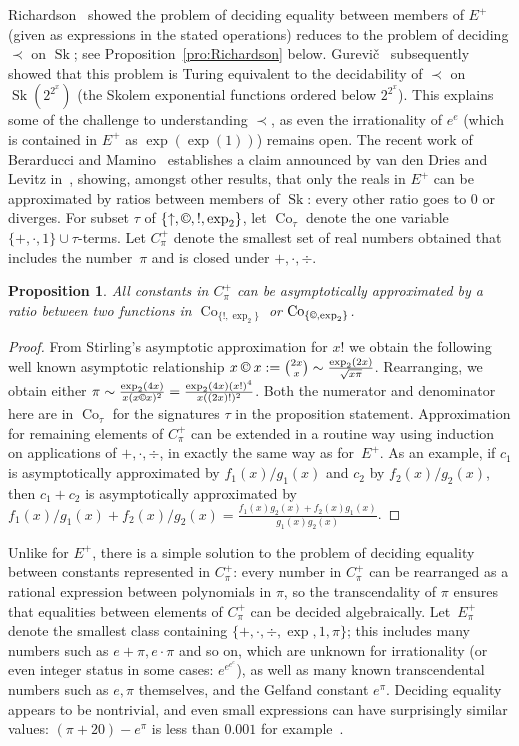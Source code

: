 \documentclass[eqnor,reqno]{amsart}
\theoremstyle{plain}
\newtheorem{pro}[thm]{Proposition}
\theoremstyle{definition}
\newcommand{\cc}{\mathbin{\textup{\copyright}}}
\newcommand{\Sk}{\operatorname{Sk}}
\newcommand{\Co}{\operatorname{Co}}
\begin{document}
Richardson~\cite{ric} showed the problem of deciding equality between members of $E^+$ (given as expressions in the stated operations) reduces to the problem of deciding $\prec$ on $\Sk$; see Proposition~\ref{pro:Richardson} below.
Gurevi\v{c}~\cite{gur86} subsequently showed that this problem is Turing equivalent to the decidability of $\prec$ on $\Sk(2^{2^x})$ (the Skolem exponential functions ordered below $2^{2^x}$).  
This explains some of the challenge to understanding $\prec$, as even the irrationality of $e^e$ (which is contained in $E^+$ as $\exp(\exp(1))$) remains open.  
The recent work of Berarducci and Mamino~\cite{bermam} establishes a claim announced by van den Dries and Levitz in~\cite{vdDlev}, showing, amongst other results, that only the reals in $E^+$ can be approximated by ratios between members of $\Sk$: every other ratio goes to $0$ or diverges.  
For subset $\tau$ of $\{\uparrow,\cc,!,\exp_2\}$, let $\Co_\tau$ denote the one variable $\{+,\cdot,1\}\cup\tau$-terms.  Let $C_\pi^+$ denote the smallest set of real numbers obtained that includes the number~$\pi$ and is closed under $+,\cdot,\div$.  
\begin{pro}
All constants in $C_\pi^+$ can be asymptotically approximated by a ratio between two functions in $\Co_{\{!,\exp_2\}}$ or $\Co_{\{\cc,\exp_2\}}$.
\end{pro}
\begin{proof}
From Stirling's asymptotic approximation for $x!$ we obtain the following well known asymptotic relationship $x\cc x:=\binom{2x}{x}\sim \frac{\exp_2(2x)}{\sqrt{x\pi}}$.  Rearranging, we obtain either $\pi\sim \frac{\exp_2(4x)}{{x (x\cc x)^2}}=\frac{\exp_2(4x)(x!)^4}{{x ((2x)!)^2}}$.  Both the numerator and denominator here are in $\Co_\tau$ for the signatures $\tau$ in the proposition statement.  Approximation for remaining elements of $C_\pi^+$ can be  extended in a routine way using induction on applications of $+,\cdot,\div$, in exactly the same way as for~$E^+$.  As an example, if $c_1$ is asymptotically approximated by $f_1(x)/g_1(x)$ and $c_2$ by $f_2(x)/g_2(x)$, then $c_1+c_2$ is asymptotically  approximated by $f_1(x)/g_1(x)+f_2(x)/g_2(x)=\frac{f_1(x)g_2(x)+f_2(x)g_1(x)}{g_1(x)g_2(x)}$.
\end{proof}
Unlike for $E^+$, there is a simple solution to the problem of deciding equality between  constants represented in $C_\pi^+$: every number in $C_\pi^+$ can be rearranged as a rational expression between polynomials in $\pi$, so the transcendality of $\pi$  ensures that equalities between elements of $C_\pi^+$ can be decided algebraically.  Let~$E_\pi^+$ denote the smallest class containing $\{+,\cdot,\div,\exp,1,\pi\}$; this includes many numbers such as $e+\pi, e\cdot\pi$ and so on, which are unknown for irrationality (or even integer status in some cases: $e^{e^{e^e}}$), as well as many known transcendental numbers such as  $e,\pi$ themselves, and the Gelfand constant $e^\pi$.  Deciding equality appears to be nontrivial, and even small expressions can have surprisingly similar values: $(\pi+20)-e^\pi$ is less than $0.001$ for example~\cite{OEIS}.
\end{document}
